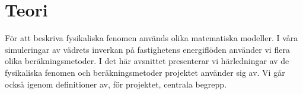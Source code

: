 \section{Teori}

För att beskriva fysikaliska fenomen används olika matematiska modeller. I våra simuleringar av vädrets inverkan på fastighetens energiflöden använder vi flera olika beräkningsmetoder. I det här avsnittet presenterar vi härledningar av de fysikaliska fenomen och beräkningsmetoder projektet använder sig av. Vi går också igenom definitioner av, för projektet, centrala begrepp.














